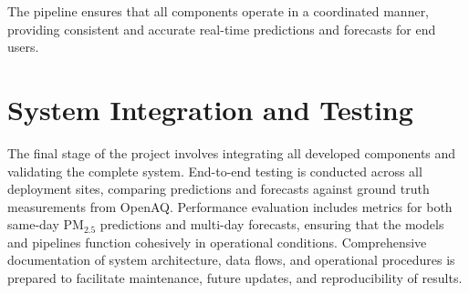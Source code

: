 \documentclass[12pt]{report}
\begin{document}
The pipeline ensures that all components operate in a coordinated manner, providing consistent and accurate real-time predictions and forecasts for end users.

\section{System Integration and Testing}

The final stage of the project involves integrating all developed components and validating the complete system. End-to-end testing is conducted across all deployment sites, comparing predictions and forecasts against ground truth measurements from OpenAQ. Performance evaluation includes metrics for both same-day PM$_{2.5}$ predictions and multi-day forecasts, ensuring that the models and pipelines function cohesively in operational conditions. Comprehensive documentation of system architecture, data flows, and operational procedures is prepared to facilitate maintenance, future updates, and reproducibility of results.






\renewcommand{\bibname}{References}


\end{document}
